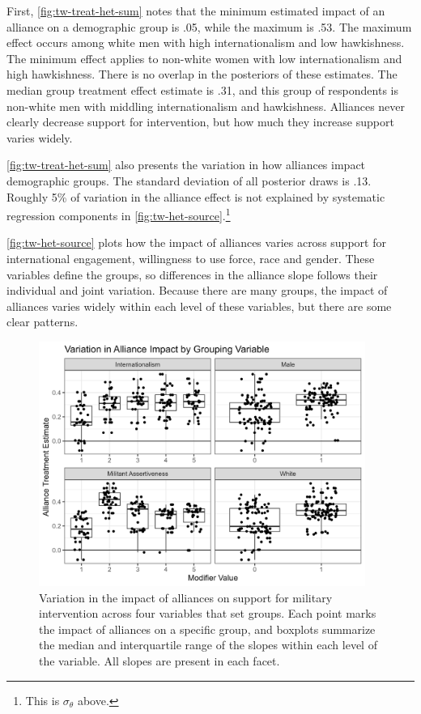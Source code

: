 \documentclass[12pt]{article}
\begin{document}
First, \autoref{fig:tw-treat-het-sum} notes that the minimum estimated impact of an alliance on a demographic group is .05, while the maximum is .53. 
The maximum effect occurs among white men with high internationalism and low hawkishness.
The minimum effect applies to non-white women with low internationalism and high hawkishness. 
There is no overlap in the posteriors of these estimates. 
The median group treatment effect estimate is .31, and this group of respondents is non-white men with middling internationalism and hawkishness. 
Alliances never clearly decrease support for intervention, but how much they increase support varies widely. 


\autoref{fig:tw-treat-het-sum} also presents the variation in how alliances impact demographic groups.
The standard deviation of all posterior draws is .13. 
Roughly 5\% of variation in the alliance effect is not explained by systematic regression components in \autoref{fig:tw-het-source}.\footnote{This is $\sigma_\theta$ above.}


\autoref{fig:tw-het-source} plots how the impact of alliances varies across support for international engagement, willingness to use force, race and gender. 
These variables define the groups, so differences in the alliance slope follows their individual and joint variation. 
Because there are many groups, the impact of alliances varies widely within each level of these variables, but there are some clear patterns. 


\begin{figure}[htpb]
	\centering
		\includegraphics[width=0.95\textwidth]{../figures/tw-het-source.png}
	\caption{Variation in the impact of alliances on support for military intervention across four variables that set groups. Each point marks the impact of alliances on a specific group, and boxplots summarize the median and interquartile range of the slopes within each level of the variable. All slopes are present in each facet.}
	\label{fig:tw-het-source}
\end{figure}
\end{document}
